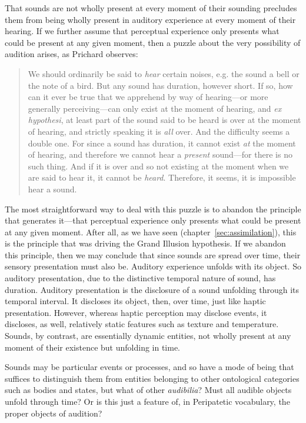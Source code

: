 That sounds are not wholly present at every moment of their sounding precludes them from being wholly present in auditory experience at every moment of their hearing. If we further assume that perceptual experience only presents what could be present at any given moment, then a puzzle about the very possibility of audition arises, as Prichard observes: 
\begin{quote}
	We should ordinarily be said to \emph{hear} certain noises, e.g. the sound a bell or the note of a bird. But any sound has duration, however short. If so, how can it ever be true that we apprehend by way of hearing---or more generally perceiving---can only exist at the moment of hearing, and \emph{ex hypothesi}, at least part of the sound said to be heard is over at the moment of hearing, and strictly speaking it is \emph{all} over. And the difficulty seems a double one. For since a sound has duration, it cannot exist \emph{at} the moment of hearing, and therefore we cannot hear a \emph{present} sound---for there is no such thing. And if it is over and so not existing at the moment when we are said to hear it, it cannot be \emph{heard}. Therefore, it seems, it is impossible hear a sound. \citep[47]{Prichard:1950ly}
\end{quote}
The most straightforward way to deal with this puzzle is to abandon the principle that generates it---that perceptual experience only presents what could be present at any given moment. After all, as we have seen (chapter~\ref{sec:assimilation}), this is the principle that was driving the Grand Illusion hypothesis. If we abandon this principle, then we may conclude that since sounds are spread over time, their sensory presentation must also be. Auditory experience unfolds with its object. So auditory presentation, due to the distinctive temporal nature of sound, has duration. Auditory presentation is the disclosure of a sound unfolding through its temporal interval. It discloses its object, then, over time, just like haptic presentation. However, whereas haptic perception may disclose events, it discloses, as well, relatively static features such as texture and temperature. Sounds, by contrast, are essentially dynamic entities, not wholly present at any moment of their existence but unfolding in time. 

Sounds may be particular events or processes, and so have a mode of being that suffices to distinguish them from entities belonging to other ontological categories such as bodies and states, but what of other \emph{audibilia}? Must all audible objects unfold through time? Or is this just a feature of, in Peripatetic vocabulary, the proper objects of audition? 

